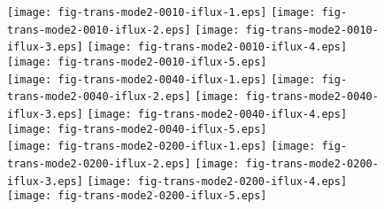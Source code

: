 \documentclass[a4paper,preprint,unsortedaddress,onecolumn]{revtex4-1}
\begin{document}
\begin{figure}
  \centering
  \texttt{[image: fig-trans-mode2-0010-iflux-1.eps]}
  \texttt{[image: fig-trans-mode2-0010-iflux-2.eps]}
  \texttt{[image: fig-trans-mode2-0010-iflux-3.eps]}
  \texttt{[image: fig-trans-mode2-0010-iflux-4.eps]}
  \texttt{[image: fig-trans-mode2-0010-iflux-5.eps]}\\
  \texttt{[image: fig-trans-mode2-0040-iflux-1.eps]}
  \texttt{[image: fig-trans-mode2-0040-iflux-2.eps]}
  \texttt{[image: fig-trans-mode2-0040-iflux-3.eps]}
  \texttt{[image: fig-trans-mode2-0040-iflux-4.eps]}
  \texttt{[image: fig-trans-mode2-0040-iflux-5.eps]}\\
  \texttt{[image: fig-trans-mode2-0200-iflux-1.eps]}
  \texttt{[image: fig-trans-mode2-0200-iflux-2.eps]}
  \texttt{[image: fig-trans-mode2-0200-iflux-3.eps]}
  \texttt{[image: fig-trans-mode2-0200-iflux-4.eps]}
  \texttt{[image: fig-trans-mode2-0200-iflux-5.eps]}\\

\end{figure}
\end{document}
